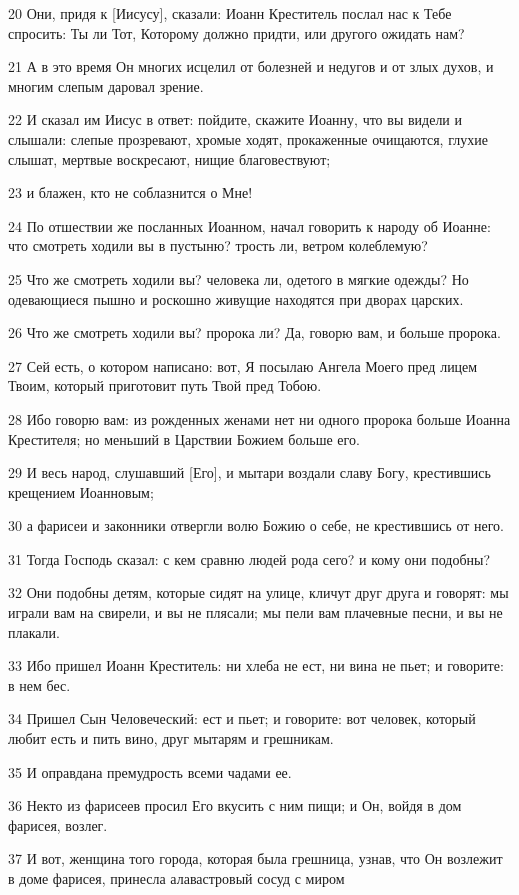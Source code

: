 \par 20 Они, придя к [Иисусу], сказали: Иоанн Креститель послал нас к Тебе спросить: Ты ли Тот, Которому должно придти, или другого ожидать нам?
\par 21 А в это время Он многих исцелил от болезней и недугов и от злых духов, и многим слепым даровал зрение.
\par 22 И сказал им Иисус в ответ: пойдите, скажите Иоанну, что вы видели и слышали: слепые прозревают, хромые ходят, прокаженные очищаются, глухие слышат, мертвые воскресают, нищие благовествуют;
\par 23 и блажен, кто не соблазнится о Мне!
\par 24 По отшествии же посланных Иоанном, начал говорить к народу об Иоанне: что смотреть ходили вы в пустыню? трость ли, ветром колеблемую?
\par 25 Что же смотреть ходили вы? человека ли, одетого в мягкие одежды? Но одевающиеся пышно и роскошно живущие находятся при дворах царских.
\par 26 Что же смотреть ходили вы? пророка ли? Да, говорю вам, и больше пророка.
\par 27 Сей есть, о котором написано: вот, Я посылаю Ангела Моего пред лицем Твоим, который приготовит путь Твой пред Тобою.
\par 28 Ибо говорю вам: из рожденных женами нет ни одного пророка больше Иоанна Крестителя; но меньший в Царствии Божием больше его.
\par 29 И весь народ, слушавший [Его], и мытари воздали славу Богу, крестившись крещением Иоанновым;
\par 30 а фарисеи и законники отвергли волю Божию о себе, не крестившись от него.
\par 31 Тогда Господь сказал: с кем сравню людей рода сего? и кому они подобны?
\par 32 Они подобны детям, которые сидят на улице, кличут друг друга и говорят: мы играли вам на свирели, и вы не плясали; мы пели вам плачевные песни, и вы не плакали.
\par 33 Ибо пришел Иоанн Креститель: ни хлеба не ест, ни вина не пьет; и говорите: в нем бес.
\par 34 Пришел Сын Человеческий: ест и пьет; и говорите: вот человек, который любит есть и пить вино, друг мытарям и грешникам.
\par 35 И оправдана премудрость всеми чадами ее.
\par 36 Некто из фарисеев просил Его вкусить с ним пищи; и Он, войдя в дом фарисея, возлег.
\par 37 И вот, женщина того города, которая была грешница, узнав, что Он возлежит в доме фарисея, принесла алавастровый сосуд с миром
